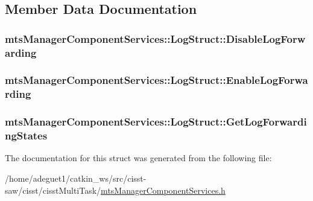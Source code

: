 \subsection{Member Data Documentation}
\hypertarget{structmts_manager_component_services_1_1_log_struct_a81e6b9e5d9cdc2e656d10a4bdd2809f4}{
\subsubsection[{Disable\-Log\-Forwarding}]{ mts\-Manager\-Component\-Services\-::\-Log\-Struct\-::\-Disable\-Log\-Forwarding}}\label{structmts_manager_component_services_1_1_log_struct_a81e6b9e5d9cdc2e656d10a4bdd2809f4}
\hypertarget{structmts_manager_component_services_1_1_log_struct_aeb9d7421249c425d58f0cff939bb7c12}{
\subsubsection[{Enable\-Log\-Forwarding}]{ mts\-Manager\-Component\-Services\-::\-Log\-Struct\-::\-Enable\-Log\-Forwarding}}\label{structmts_manager_component_services_1_1_log_struct_aeb9d7421249c425d58f0cff939bb7c12}
\hypertarget{structmts_manager_component_services_1_1_log_struct_afc7c70d03ea7f0f532e7b9154329d71b}{
\subsubsection[{Get\-Log\-Forwarding\-States}]{ mts\-Manager\-Component\-Services\-::\-Log\-Struct\-::\-Get\-Log\-Forwarding\-States}}\label{structmts_manager_component_services_1_1_log_struct_afc7c70d03ea7f0f532e7b9154329d71b}


The documentation for this struct was generated from the following file\-:\begin{DoxyCompactItemize}
\item 
/home/adeguet1/catkin\-\_\-ws/src/cisst-\/saw/cisst/cisst\-Multi\-Task/\hyperlink{mts_manager_component_services_8h}{mts\-Manager\-Component\-Services.\-h}\end{DoxyCompactItemize}
